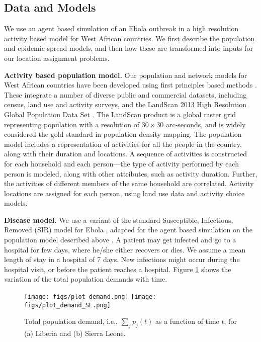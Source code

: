 \subsection*{Data and Models}
We use an agent based simulation of an Ebola outbreak in a high resolution activity based model for 
West African countries.
We first describe the population and epidemic spread models, and then how these are transformed into
inputs for our location assignment problems.

\noindent
\textbf{Activity based population model.}
Our population and network models for West African countries
have been developed using first principles based methods \cite{barrett:wsc09,eubank:nature04}.
These integrate a number of diverse public and commercial datasets, including census, 
land use and activity surveys, and the LandScan 2013 High Resolution Global Population Data Set \cite{LandScan}.
The LandScan product is a global raster grid representing population with a resolution of 
$30 \times 30$ arc-seconds, and is widely considered the gold standard in population density mapping. 
The population model includes a representation of activities for all the people in the country,
along with their duration and locations. 
A sequence of activities is constructed for each household and each person---the type of activity 
performed by each person is modeled, along with other attributes,
such as activity duration. Further, the activities of different members of the same household are correlated.
Activity locations are assigned for each person, using land use data and activity choice models.

\noindent
\textbf{Disease model.}
We use a variant of the standard Susceptible, Infectious, Removed (SIR) model for 
Ebola \cite{legrand_grais_boelle_valleron_flahault_2007}, adapted for the 
agent based simulation on the population model described above \cite{rivers:2014ea}.
A patient may get infected and go to a hospital for few days, where he/she either recovers or dies.
We assume a mean length of stay in a hospital of 7 days. New infections might occur during
the hospital visit, or before the patient reaches a hospital. 
Figure \ref{fig:demand-dist} shows the variation of the total population demands with time.


\begin{figure}
\centering %
\texttt{[image: figs/plot\_demand.png]}
\texttt{[image: figs/plot\_demand\_SL.png]}
\caption{Total population demand, i.e., $\sum_j p_j(t)$ as a function of time $t$, for
(a) Liberia and (b) Sierra Leone.}
\label{fig:demand-dist}
\end{figure}

